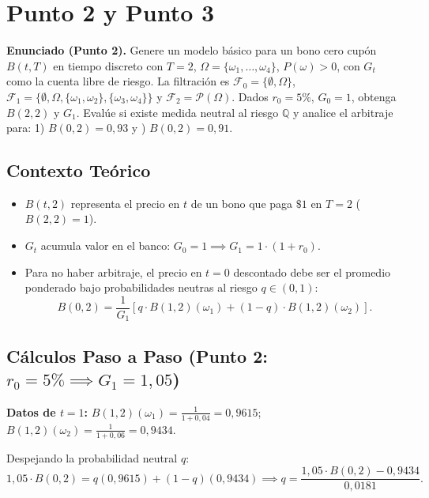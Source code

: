 \documentclass[11pt, a4paper]{article}
\begin{document}
\newpage

\section*{Punto 2 y Punto 3}
\textbf{Enunciado (Punto 2).} Genere un modelo básico para un bono cero cupón $B(t,T)$ en tiempo discreto con $T=2$, $\Omega=\{\omega_1,\dots,\omega_4\}$, $P(\omega)>0$, con $G_t$ como la cuenta libre de riesgo. La filtración es $\mathcal{F}_0=\{\emptyset,\Omega\}$, $\mathcal{F}_1=\{\emptyset,\Omega,\{\omega_1,\omega_2\},\{\omega_3,\omega_4\}\}$ y $\mathcal{F}_2=\mathcal{P}(\Omega)$. Dados $r_0=5\%$, $G_0=1$, obtenga $B(2,2)$ y $G_1$.
Evalúe si existe medida neutral al riesgo $\mathbb{Q}$ y analice el arbitraje para:
1) $B(0,2) = 0{,}93$ \quad y ) $B(0,2) = 0{,}91$.

\subsection*{Contexto Teórico}
\begin{itemize}
    \item $B(t,2)$ representa el precio en $t$ de un bono que paga $\$1$ en $T=2$ ($B(2,2)=1$).
    \item $G_t$ acumula valor en el banco: $G_0=1 \implies G_1 = 1 \cdot (1+r_0)$.
    \item Para no haber arbitraje, el precio en $t=0$ descontado debe ser el promedio ponderado bajo probabilidades neutras al riesgo $q \in (0,1)$:
    \[
    B(0,2) = \frac{1}{G_1} \left[ q \cdot B(1,2)(\omega_1) + (1-q) \cdot B(1,2)(\omega_2) \right].
    \]
\end{itemize}

\subsection*{Cálculos Paso a Paso (Punto 2: $r_0 = 5\% \implies G_1 = 1{,}05$)}
\textbf{Datos de $t=1$:} $B(1,2)(\omega_1) = \frac{1}{1+0{,}04} = 0{,}9615$; \quad $B(1,2)(\omega_2) = \frac{1}{1+0{,}06} = 0{,}9434$.

Despejando la probabilidad neutral $q$:
\[
1{,}05 \cdot B(0,2) = q(0{,}9615) + (1-q)(0{,}9434) \implies q = \frac{1{,}05 \cdot B(0,2) - 0{,}9434}{0{,}0181}.
\]
\end{document}

